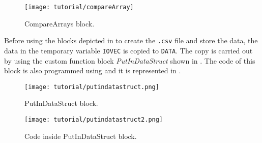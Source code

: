 \begin{figure}[H] \centering
 \texttt{[image: tutorial/compareArray]}
  \caption{CompareArrays block.}
  \label{fig:compareArrayBlock}
\end{figure}

Before using the blocks depicted in  to create the \verb|.csv| file and store the data, the data in the temporary
variable \verb|IOVEC| is copied to \verb|DATA|. The copy is carried out by using the custom function block
\emph{PutInDataStruct} shown in . The code of this block is also programmed using \SCL{} and it is represented in .  

\begin{figure}[H] \centering
 \texttt{[image: tutorial/putindatastruct.png]}
  \caption{PutInDataStruct block.}
  \label{fig:putInDataStructBlock}
\end{figure}

\begin{figure}[H] \centering
 \texttt{[image: tutorial/putindatastruct2.png]}
  \caption{Code inside PutInDataStruct block.}
  \label{fig:putInDataStructBlockCode}
\end{figure}

